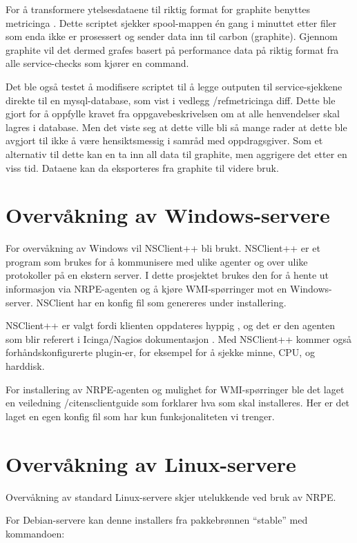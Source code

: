 For å transformere ytelsesdataene til riktig format for graphite benyttes metricinga \cite{metricinga}. Dette scriptet sjekker spool-mappen én gang i minuttet etter filer som enda ikke er prosessert og sender data inn til carbon (graphite). 
Gjennom graphite vil det dermed grafes basert på performance data på riktig format fra alle service-checks som kjører en command.

Det ble også testet å modifisere scriptet til å legge outputen til service-sjekkene direkte til en mysql-database, som vist i vedlegg /ref{metricinga diff}. Dette ble gjort for å oppfylle kravet fra oppgavebeskrivelsen om at alle henvendelser skal lagres i database. Men det viste seg at dette ville bli så mange rader at dette ble avgjort til ikke å være hensiktsmessig i samråd med oppdragsgiver. Som et alternativ til dette kan en ta inn all data til graphite, men aggrigere det etter en viss tid. Dataene kan da eksporteres fra graphite til videre bruk.

\section{Overvåkning av Windows-servere}
For overvåkning av Windows vil NSClient++ bli brukt. NSClient++ er et program som brukes for  å kommunisere med ulike agenter og over ulike protokoller på en ekstern server. I dette prosjektet brukes den for å hente ut informasjon via NRPE-agenten og å kjøre WMI-spørringer mot en Windows-server. NSClient har en konfig fil som genereres under installering. 

NSClient++ er valgt fordi klienten oppdateres hyppig \cite{nsclient}, og det er den agenten som blir referert i Icinga/Nagios dokumentasjon \cite{icingawin}. Med NSClient++ kommer også forhåndskonfigurerte plugin-er, for eksempel for å sjekke minne, CPU, og harddisk.

For installering av NRPE-agenten og mulighet for WMI-spørringer ble det laget en veiledning /cite{nsclientguide} som forklarer hva som skal installeres. Her er det laget en egen konfig fil som har kun funksjonaliteten vi trenger. 

\section{Overvåkning av Linux-servere}
Overvåkning av standard Linux-servere skjer utelukkende ved bruk av NRPE. 

For Debian-servere kan denne installers fra pakkebrønnen “stable” med kommandoen:

